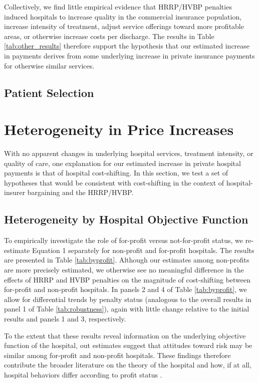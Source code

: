 \documentclass[12pt]{article}
\begin{document}
Collectively, we find little empirical evidence that HRRP/HVBP penalties induced hospitals to increase quality in the commercial insurance population, increase intensity of treatment, adjust service offerings toward more profitable areas, or otherwise increase costs per discharge. The results in Table \ref{tab:other_results} therefore support the hypothesis that our estimated increase in payments derives from some underlying increase in private insurance payments for otherwise similar services.

\subsection{Patient Selection}


\section{Heterogeneity in Price Increases}
\label{sec:Ext}
With no apparent changes in underlying hospital services, treatment intensity, or quality of care, one explanation for our estimated increase in private hospital payments is that of hospital cost-shifting. In this section, we test a set of hypotheses that would be consistent with cost-shifting in the context of hospital-insurer bargaining and the HRRP/HVBP.


\subsection{Heterogeneity by Hospital Objective Function}
To empirically investigate the role of for-profit versus not-for-profit status, we re-estimate Equation 1 separately for non-profit and for-profit hospitals.  The results are presented in Table \ref{tab:byprofit}. Although our estimates among non-profits are more precisely estimated, we otherwise see no meaningful difference in the effects of HRRP and HVBP penalties on the magnitude of cost-shifting between for-profit and non-profit hospitals. In panels 2 and 4 of Table \ref{tab:byprofit}, we allow for differential trends by penalty status (analogous to the overall results in panel 1 of Table \ref{tab:robustness}), again with little change relative to the initial results and panels 1 and 3, respectively.

To the extent that these results reveal information on the underlying objective function of the hospital, out estimates suggest that attitudes toward risk may be similar among for-profit and non-profit hospitals. These findings therefore contribute the broader literature on the theory of the hospital and how, if at all, hospital behaviors differ according to profit status \citep{sloan2001,duggan2002,horwitz2005,horwitz2009,david2009}.
\end{document}
